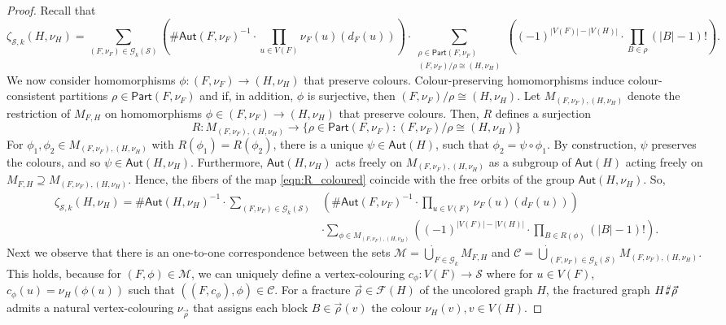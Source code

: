 \documentclass[authorcolumns,numberwithinsect]{no-lipics-v2022}
\def\fracture#1#2{\ensuremath{#1\raisebox{.2ex}{\rotatebox[origin=c]{-15}{$\sharp$}}#2}}
\def\fracture#1#2{\ensuremath{#1\raisebox{.2ex}{\rotatebox[origin=c]{-15}{$\sharp$}}#2}}
\begin{document}
\begin{proof}
Recall that 
\[\zeta_{\mathcal{S}, k}(H,\nu_H) = \!\!\!\sum_{(F,\nu_F) \in \mathcal{G}_k(\mathcal{S})} \left(\#\mathsf{Aut}(F, \nu_F)^{-1}\cdot\prod_{u\in V(F)}\nu_F(u)(d_F(u))\right)\cdot \sum_{\substack{\rho \in \mathsf{Part}(F, \nu_F)\\(F, \nu_F)/\rho \cong (H, \nu_H)}}\left( (-1)^{|V(F)|-|V(H)|}\cdot \prod_{B \in \rho} (|B|-1)!\right). \]
We now consider homomorphisms $\phi : (F, \nu_F) \to (H, \nu_H)$ that preserve colours. Colour-preserving homomorphisms induce colour-consistent partitions $\rho \in \mathsf{Part}(F, \nu_F)$ and if, in addition, $\phi$ is surjective, then $(F, \nu_F)/\rho \cong (H, \nu_H)$. Let $M_{(F, \nu_F), (H, \nu_H)}$ denote the restriction of $M_{F, H}$ on homomorphisms $\phi \in (F, \nu_F) \to (H, \nu_H)$ that preserve colours. Then, $R$ defines a surjection
\begin{equation} \label{eqn:R_coloured}
R: M_{(F, \nu_F), (H, \nu_H)} \to \{\rho \in \mathsf{Part}(F, \nu_F) : (F, \nu_F)/\rho \cong (H, \nu_H)\}
\end{equation}
For $\phi_1, \phi_2 \in M_{(F, \nu_F), (H, \nu_H)}$ with $R(\phi_1) = R(\phi_2)$, there is a unique $\psi \in \mathsf{Aut}(H)$, such that $\phi_2 = \psi \circ \phi_1$. By construction, $\psi$ preserves the colours, and so $\psi \in \mathsf{Aut}(H, \nu_H)$. Furthermore, $\mathsf{Aut}(H, \nu_H)$ acts freely on $M_{(F, \nu_F), (H, \nu_H)}$ as a subgroup of $\mathsf{Aut}(H)$ acting freely on $M_{F, H} \supseteq M_{(F, \nu_F), (H, \nu_H)}$. Hence, the fibers of the map \eqref{eqn:R_coloured} coincide with the free orbits of the group $\mathsf{Aut}(H, \nu_H)$. So,
\begin{align*}
\zeta_{\mathcal{S}, k}(H,\nu_H) = \#\mathsf{Aut}(H, \nu_H)^{-1}  \cdot \sum_{(F, \nu_F)\in \mathcal{G}_k(\mathcal{S})} &\left(\#\mathsf{Aut}(F, \nu_F)^{-1}\cdot   \prod_{u\in V(F)}\nu_F(u)(d_F(u))\right) \\ & \cdot \sum_{\phi \in M_{(F,\nu_F),(H,\nu_H)}}\left( (-1)^{|V(F)|-|V(H)|}\cdot \prod_{B \in R(\phi)} (|B|-1)!\right).
\end{align*}
Next we observe that there is an one-to-one correspondence between the sets $\mathcal{M} = \dot\bigcup_{F \in \mathcal{G}_k}M_{F, H}$ and $\mathcal{C} = \dot\bigcup_{(F, \nu_F) \in \mathcal{G}_k(\mathcal{S})}M_{(F, \nu_F), (H, \nu_H)}$. This holds, because for $(F, \phi) \in \mathcal{M}$, we can uniquely define a vertex-colouring $c_{\phi} : V(F) \to \mathcal{S}$ where for $u \in V(F)$, $c_{\phi}(u) = \nu_H(\phi(u))$ such that $((F, c_{\phi}), \phi) \in \mathcal{C}$. For a fracture $\vec\rho \in \mathcal{F}(H)$ of the uncolored graph $H$, the fractured graph $\fracture{H}{\vec\rho}$ admits a natural vertex-colouring $\nu_{\vec\rho}$ that assigns each block $B \in \vec\rho(v)$ the colour $\nu_H(v), v \in V(H)$. 

\end{proof}
\end{document}
